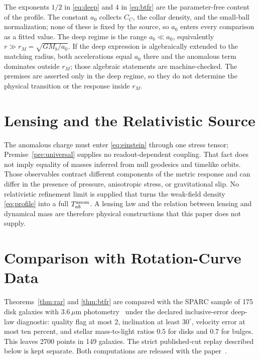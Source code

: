 \documentclass[11pt]{article}
\begin{document}
The exponents \(1/2\) in \eqref{eq:deep} and \(4\) in \eqref{eq:btfr} are
the parameter-free content of the profile. The constant \(a_0\) collects
\(C_C\), the collar density, and the small-ball normalization; none of these
is fixed by the source, so \(a_0\) enters every comparison as a fitted
value. The deep regime is the range \(a_b\ll a_0\), equivalently
\(r\gg r_M=\sqrt{GM_b/a_0}\). If the deep expression is algebraically
extended to the matching radius, both accelerations equal \(a_0\) there and
the anomalous term dominates outside \(r_M\); those algebraic statements are
machine-checked. The premises are asserted only in the deep regime, so they
do not determine the physical transition or the response inside \(r_M\).

\section{Lensing and the Relativistic Source}
\label{sec:lensing}

The anomalous charge must enter \eqref{eq:einstein} through one stress tensor;
Premise~\ref{pre:universal} supplies no readout-dependent coupling. That fact
does not imply equality of masses inferred from null geodesics and timelike
orbits. Those observables contract different components of the metric response
and can differ in the presence of pressure, anisotropic stress, or gravitational
slip. No relativistic refinement limit is supplied that turns the weak-field
density \eqref{eq:profile} into a full \(T_{ab}^{\rm anom}\). A lensing law and
the relation between lensing and dynamical mass are therefore physical
constructions that this paper does not supply.

\section{Comparison with Rotation-Curve Data}
\label{sec:data}

Theorems~\ref{thm:rar} and \ref{thm:btfr} are compared with the SPARC sample
of 175 disk galaxies with \(3.6\,\mu\)m photometry~\cite{sparc2016} under the
declared inclusive-error deep-law diagnostic: quality flag at most 2,
inclination at least \(30^\circ\), velocity error at most ten percent, and
stellar mass-to-light ratios \(0.5\) for disks and \(0.7\) for bulges. This
leaves 2700 points in 149 galaxies. The strict published-cut replay described
below is kept separate. Both computations are released with the
paper~\cite{mls2016,ophrar}.
\end{document}
